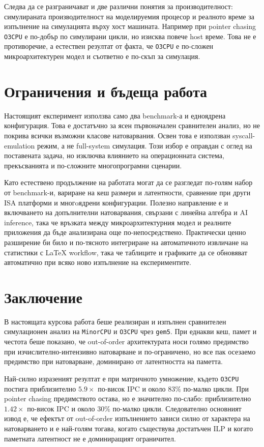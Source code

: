 \documentclass[12pt,a4paper]{article}
\begin{document}
Следва да се разграничават и две различни понятия за производителност: симулираната производителност на моделируемия процесор и реалното време за изпълнение на симулацията върху хост машината. Например при pointer chasing \texttt{O3CPU} е по-добър по симулирани цикли, но изисква повече host време. Това не е противоречие, а естествен резултат от факта, че \texttt{O3CPU} е по-сложен микроархитектурен модел и съответно е по-скъп за симулация.

\section{Ограничения и бъдеща работа}
Настоящият експеримент използва само два benchmark-а и едноядрена конфигурация. Това е достатъчно за ясен първоначален сравнителен анализ, но не покрива всички възможни класове натоварвания. Освен това е използван syscall-emulation режим, а не full-system симулация. Този избор е оправдан с оглед на поставената задача, но изключва влиянието на операционната система, прекъсванията и по-сложните многопрограмни сценарии.

Като естествено продължение на работата могат да се разгледат по-голям набор от benchmark-и, вариране на кеш размери и латентности, сравнение при други ISA платформи и многoядрени конфигурации. Полезно направление е и включването на допълнителни натоварвания, свързани с линейна алгебра и AI inference, така че връзката между микроархитектурния модел и реалните приложения да бъде анализирана още по-непосредствено. Практически ценно разширение би било и по-тясното интегриране на автоматичното извличане на статистики с LaTeX workflow, така че таблиците и графиките да се обновяват автоматично при всяко ново изпълнение на експериментите.

\section{Заключение}
В настоящата курсова работа беше реализиран и изпълнен сравнителен симулационен анализ на \texttt{MinorCPU} и \texttt{O3CPU} чрез \texttt{gem5}. При еднакви кеш, памет и честота беше показано, че out-of-order архитектурата носи голямо предимство при изчислително-интензивно натоварване и по-ограничено, но все пак осезаемо предимство при натоварване, доминирано от латентността на паметта.

Най-силно изразеният резултат е при матричното умножение, където \texttt{O3CPU} постига приблизително \(5.9\times\) по-висок IPC и около \(83\%\) по-малко цикли. При pointer chasing предимството остава, но е значително по-слабо: приблизително \(1.42\times\) по-висок IPC и около \(30\%\) по-малко цикли. Следователно основният извод е, че ефектът от out-of-order изпълнението зависи силно от характера на натоварването и е най-голям тогава, когато съществува достатъчен ILP и когато паметната латентност не е доминиращият ограничител.
\end{document}
